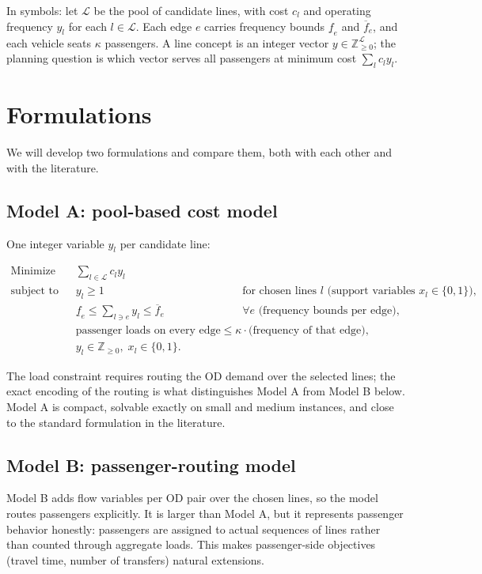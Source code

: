 \documentclass[11pt]{article}
\begin{document}
In symbols: let $\mathcal{L}$ be the pool of candidate lines, with cost $c_l$ and operating frequency $y_l$ for each $l \in \mathcal{L}$. Each edge $e$ carries frequency bounds $\underline{f}_e$ and $\overline{f}_e$, and each vehicle seats $\kappa$ passengers. A line concept is an integer vector $y \in \mathbb{Z}_{\ge 0}^{\mathcal{L}}$; the planning question is which vector serves all passengers at minimum cost $\sum_{l} c_l y_l$.

\section{Formulations}

We will develop two formulations and compare them, both with each other and with the literature.

\subsection*{Model A: pool-based cost model}

One integer variable $y_l$ per candidate line:

\begin{align*}
  \text{Minimize} \quad & \sum_{l \in \mathcal{L}} c_l y_l \\
  \text{subject to} \quad & y_l \ge 1 \quad && \text{for chosen lines } l \text{ (support variables } x_l \in \{0,1\}), \\
  & \underline{f}_e \le \sum_{l \ni e} y_l \le \overline{f}_e \quad && \forall e \text{ (frequency bounds per edge)}, \\
  & \text{passenger loads on every edge} \le \kappa \cdot \text{(frequency of that edge)}, \\
  & y_l \in \mathbb{Z}_{\ge 0}, \; x_l \in \{0,1\}.
\end{align*}

The load constraint requires routing the OD demand over the selected lines; the exact encoding of the routing is what distinguishes Model A from Model B below. Model A is compact, solvable exactly on small and medium instances, and close to the standard formulation in the literature.

\subsection*{Model B: passenger-routing model}

Model B adds flow variables per OD pair over the chosen lines, so the model routes passengers explicitly. It is larger than Model A, but it represents passenger behavior honestly: passengers are assigned to actual sequences of lines rather than counted through aggregate loads. This makes passenger-side objectives (travel time, number of transfers) natural extensions.
\end{document}
